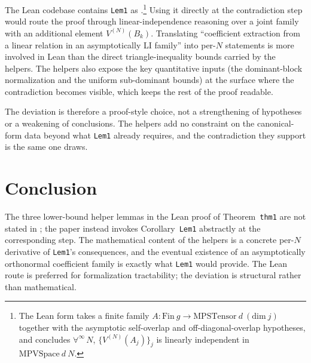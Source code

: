 \documentclass[11pt]{article}
\begin{document}
The Lean codebase contains \texttt{Lem1} as
\cite[]{}.\footnote{%
The Lean form takes a finite family $A : \mathrm{Fin}\ g \to
\mathrm{MPSTensor}\ d\ (\mathrm{dim}\ j)$ together with the asymptotic
self-overlap and off-diagonal-overlap hypotheses, and concludes
$\forall^{\infty}\,N$, $\{V^{(N)}(A_j)\}_j$ is linearly independent in
$\mathrm{MPVSpace}\ d\ N$.}  Using it directly at the contradiction step
would route the proof through linear-independence reasoning over a joint
family with an additional element $V^{(N)}(B_k)$.  Translating
``coefficient extraction from a linear relation in an asymptotically LI
family'' into per-$N$ statements is more involved in Lean than the direct
triangle-inequality bounds carried by the helpers.  The helpers also
expose the key quantitative inputs (the dominant-block normalization and
the uniform sub-dominant bounds) at the surface where the contradiction
becomes visible, which keeps the rest of the proof readable.

The deviation is therefore a proof-style choice, not a strengthening of
hypotheses or a weakening of conclusions.  The helpers add no constraint
on the canonical-form data beyond what \texttt{Lem1} already requires,
and the contradiction they support is the same one
\cite{Cirac2016MPDO_arXiv} draws.

\section{Conclusion}

The three lower-bound helper lemmas in the Lean proof of
Theorem~\texttt{thm1} are not stated in
\cite{Cirac2016MPDO_arXiv}; the paper instead invokes
Corollary~\texttt{Lem1} abstractly at the corresponding step.  The
mathematical content of the helpers is a concrete per-$N$ derivative of
\texttt{Lem1}'s consequences, and the eventual existence of an
asymptotically orthonormal coefficient family is exactly what
\texttt{Lem1} would provide.  The Lean route is preferred for
formalization tractability; the deviation is structural rather than
mathematical.



\end{document}
